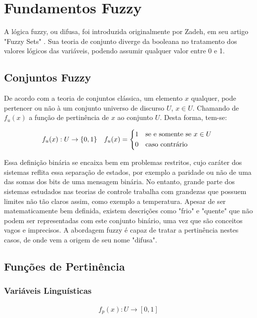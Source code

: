 %

\chapter{Fundamentos Fuzzy}
A lógica fuzzy, ou difusa, foi introduzida originalmente por Zadeh, em seu artigo "Fuzzy Sets" \cite{zadeh}. Sua teoria de conjunto diverge da booleana 
no tratamento dos valores lógicos das variáveis, podendo assumir qualquer valor entre 0 e 1. 

\section{Conjuntos Fuzzy}
\indent De acordo com a teoria de conjuntos clássica, um elemento $x$ qualquer, pode pertencer ou não à um conjunto universo de discurso $U$, $x \in U$. Chamando de $f_u(x)$ a função de pertinência de $x$ ao conjunto $U$. Desta forma, tem-se:

\begin{align}
	f_u(x) : U \rightarrow \{0,1\}
	&& f_u(x) =
	\begin{cases*}
		1 & se e somente se $x \in U$ \\
		0 & caso contrário
	\end{cases*}
	\label{eqFPertinencia}
\end{align}

Essa definição binária se encaixa bem em problemas restritos, cujo caráter dos sistemas reflita essa separação de estados, por exemplo a paridade ou não de uma das somas dos bits de uma mensagem binária. No entanto, grande parte dos sistemas estudados nas teorias de controle trabalha com grandezas que possuem limites não tão claros assim, como exemplo a temperatura. Apesar de ser matematicamente bem definida, existem descrições como "frio" e "quente" que não podem ser representadas com este conjunto binário, uma vez que são conceitos vagos e imprecisos. A abordagem fuzzy é capaz de tratar a pertinência nestes casos, de onde vem a origem de seu nome "difusa".

\section{Funções de Pertinência}
	\subsection{Variáveis Linguísticas}
	
	\begin{align}
		f_p(x) : U \rightarrow [0,1]
		\label{eqFuncPertFuzzy}
	\end{align}
	
